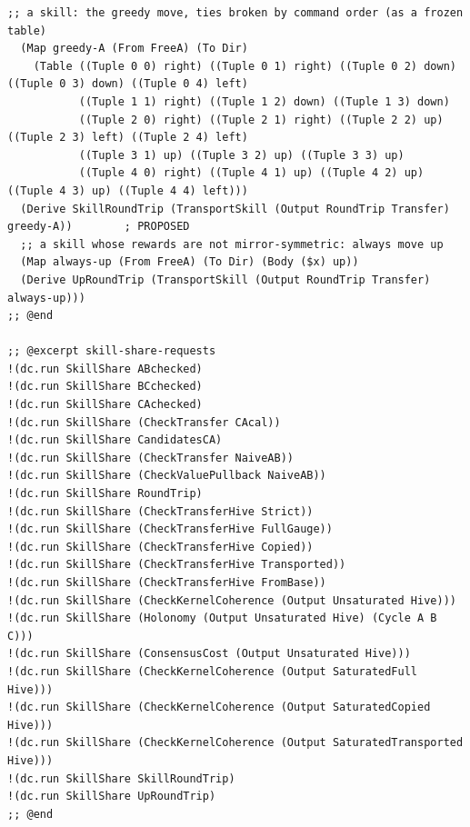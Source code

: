 \documentclass[11pt]{article}
\theoremstyle{definition}
\theoremstyle{plain}
\begin{document}
\begin{lstlisting}[style=mettafull]
  ;; a skill: the greedy move, ties broken by command order (as a frozen table)
  (Map greedy-A (From FreeA) (To Dir)
    (Table ((Tuple 0 0) right) ((Tuple 0 1) right) ((Tuple 0 2) down) ((Tuple 0 3) down) ((Tuple 0 4) left)
           ((Tuple 1 1) right) ((Tuple 1 2) down) ((Tuple 1 3) down)
           ((Tuple 2 0) right) ((Tuple 2 1) right) ((Tuple 2 2) up) ((Tuple 2 3) left) ((Tuple 2 4) left)
           ((Tuple 3 1) up) ((Tuple 3 2) up) ((Tuple 3 3) up)
           ((Tuple 4 0) right) ((Tuple 4 1) up) ((Tuple 4 2) up) ((Tuple 4 3) up) ((Tuple 4 4) left)))
  (Derive SkillRoundTrip (TransportSkill (Output RoundTrip Transfer) greedy-A))        ; PROPOSED
  ;; a skill whose rewards are not mirror-symmetric: always move up
  (Map always-up (From FreeA) (To Dir) (Body ($x) up))
  (Derive UpRoundTrip (TransportSkill (Output RoundTrip Transfer) always-up)))
;; @end

;; @excerpt skill-share-requests
!(dc.run SkillShare ABchecked)
!(dc.run SkillShare BCchecked)
!(dc.run SkillShare CAchecked)
!(dc.run SkillShare (CheckTransfer CAcal))
!(dc.run SkillShare CandidatesCA)
!(dc.run SkillShare (CheckTransfer NaiveAB))
!(dc.run SkillShare (CheckValuePullback NaiveAB))
!(dc.run SkillShare RoundTrip)
!(dc.run SkillShare (CheckTransferHive Strict))
!(dc.run SkillShare (CheckTransferHive FullGauge))
!(dc.run SkillShare (CheckTransferHive Copied))
!(dc.run SkillShare (CheckTransferHive Transported))
!(dc.run SkillShare (CheckTransferHive FromBase))
!(dc.run SkillShare (CheckKernelCoherence (Output Unsaturated Hive)))
!(dc.run SkillShare (Holonomy (Output Unsaturated Hive) (Cycle A B C)))
!(dc.run SkillShare (ConsensusCost (Output Unsaturated Hive)))
!(dc.run SkillShare (CheckKernelCoherence (Output SaturatedFull Hive)))
!(dc.run SkillShare (CheckKernelCoherence (Output SaturatedCopied Hive)))
!(dc.run SkillShare (CheckKernelCoherence (Output SaturatedTransported Hive)))
!(dc.run SkillShare SkillRoundTrip)
!(dc.run SkillShare UpRoundTrip)
;; @end


\end{lstlisting}
\end{document}
